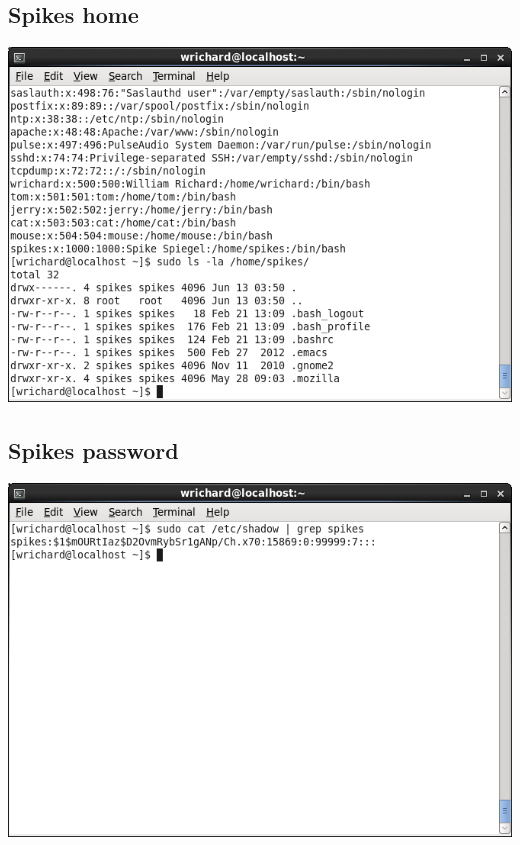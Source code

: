 \documentclass[a4paper,10pt]{article}
\begin{document}
\subsection{Spikes home}
\begin{center}
 \includegraphics[width=\linewidth]{./spikeshome.png}
\end{center}

\subsection{Spikes password}
\begin{center}
 \includegraphics[width=\linewidth]{./spikespasswd.png}
\end{center}
\end{document}
